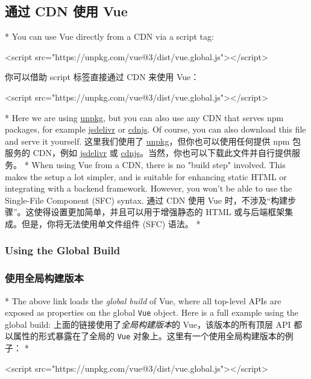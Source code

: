 \begin{paracol}{2}
\subsection{通过 CDN 使用 Vue}
\switchcolumn[0]*%
You can use Vue directly from a CDN via a script tag:
\begin{codeHtml}
<script src="https://unpkg.com/vue@3/dist/vue.global.js"></script>
\end{codeHtml}  
\switchcolumn
你可以借助 script 标签直接通过 CDN 来使用 Vue：
\begin{codeHtml}
<script src="https://unpkg.com/vue@3/dist/vue.global.js"></script>
\end{codeHtml}  
\switchcolumn[0]*%
Here we are using \href{https://unpkg.com/}{unpkg}, but you can also use
any CDN that serves npm packages, for example
\href{https://www.jsdelivr.com/package/npm/vue}{jsdelivr} or
\href{https://cdnjs.com/libraries/vue}{cdnjs}. Of course, you can also
download this file and serve it yourself.
\switchcolumn
这里我们使用了 \href{https://unpkg.com/}{unpkg}，但你也可以使用任何提供
npm 包服务的 CDN，例如
\href{https://www.jsdelivr.com/package/npm/vue}{jsdelivr} 或
\href{https://cdnjs.com/libraries/vue}{cdnjs}。当然，你也可以下载此文件并自行提供服务。
\switchcolumn[0]*%
When using Vue from a CDN, there is no "build step" involved. This makes
the setup a lot simpler, and is suitable for enhancing static HTML or
integrating with a backend framework. However, you won't be able to use
the Single-File Component (SFC) syntax.
\switchcolumn
通过 CDN 使用 Vue
时，不涉及``构建步骤''。这使得设置更加简单，并且可以用于增强静态的 HTML
或与后端框架集成。但是，你将无法使用单文件组件 (SFC) 语法。
\switchcolumn[0]*%
\subsubsection{Using the Global Build}
\switchcolumn
\subsubsection{使用全局构建版本}
\switchcolumn[0]*%
The above link loads the \emph{global build} of Vue, where all top-level
APIs are exposed as properties on the global \texttt{Vue} object. Here
is a full example using the global build:
\switchcolumn
上面的链接使用了\emph{全局构建版本}的 Vue，该版本的所有顶层 API
都以属性的形式暴露在了全局的 \texttt{Vue}
对象上。这里有一个使用全局构建版本的例子：
\switchcolumn[0]*%
\begin{codeHtml}
<script src="https://unpkg.com/vue@3/dist/vue.global.js"></script>


\end{codeHtml}
\end{paracol}
